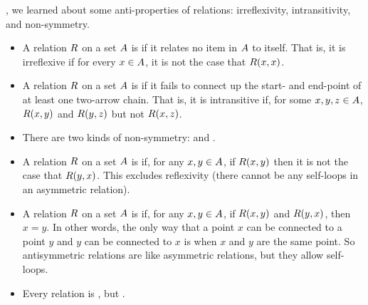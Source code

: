 \documentclass[../../../main.tex]{subfiles}
\begin{document}
, we learned about some anti-properties of relations: irreflexivity, intransitivity, and non-symmetry.

\begin{itemize}

  \item A relation $R$ on a set $A$ is  if it relates no item in $A$ to itself. That is, it is irreflexive if for every $x \in A$, it is not the case that $R(x, x)$.
    
  \item A relation $R$ on a set $A$ is  if it fails to connect up the start- and end-point of at least one two-arrow chain. That is, it is intransitive if, for some $x, y, z \in A$, $R(x, y)$ and $R(y, z)$ but not $R(x, z)$.

  \item There are two kinds of non-symmetry:  and .

  \item A relation $R$ on a set $A$ is  if, for any $x, y \in A$, if $R(x, y)$ then it is not the case that $R(y, x)$. This excludes reflexivity (there cannot be any self-loops in an asymmetric relation).
  
  \item A relation $R$ on a set $A$ is  if, for any $x, y \in A$, if $R(x, y)$ and $R(y, x)$, then $x = y$. In other words, the only way that a point $x$ can be connected to a point $y$ and $y$ can be connected to $x$ is when $x$ and $y$ are the same point. So antisymmetric relations are like asymmetric relations, but they allow self-loops.
  
  \item Every  relation is , but .


\end{itemize}
\end{document}
